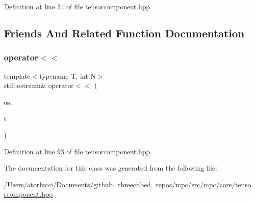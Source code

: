 Definition at line 54 of file tensorcomponent.\+hpp.



\subsection{Friends And Related Function Documentation}
\mbox{\label{classmpc_1_1core_1_1_tensor_rank_n_component_aeecda552ac00ef38d6ff442f48718c6b}} 
\subsubsection{\texorpdfstring{operator$<$$<$}{operator<<}}
{\footnotesize\ttfamily template$<$typename T, int N$>$ \\
std\+::ostream\& operator$<$$<$ (\begin{DoxyParamCaption}\item[{std\+::ostream \&}]{os,  }\item[{const \mbox{\hyperlink{classmpc_1_1core_1_1_tensor_rank_n_component}{Tensor\+Rank\+N\+Component}}$<$ T, N $>$ \&}]{t }\end{DoxyParamCaption})\hspace{0.3cm}{\ttfamily [friend]}}



Definition at line 93 of file tensorcomponent.\+hpp.



The documentation for this class was generated from the following file\+:\begin{DoxyCompactItemize}
\item 
/\+Users/atorlucci/\+Documents/github\+\_\+threecubed\+\_\+repos/mpc/src/mpc/core/\mbox{\hyperlink{tensorcomponent_8hpp}{tensorcomponent.\+hpp}}\end{DoxyCompactItemize}
